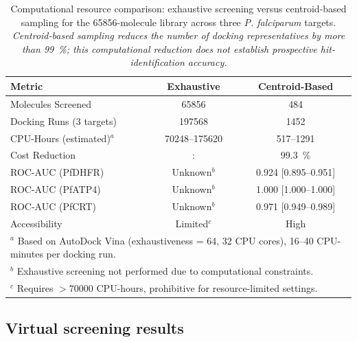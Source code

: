\documentclass[journal=jcisd8,manuscript=suppinfo]{achemso}
\begin{document}
\begin{table}[!htbp]
\centering
\caption{Computational resource comparison: exhaustive screening versus centroid-based sampling for the \num{65856}-molecule library across three \textit{P. falciparum} targets. \textit{Centroid-based sampling reduces the number of docking representatives by more than \qty{99}{\percent}; this computational reduction does not establish prospective hit-identification accuracy.}}
\label{tab:computational_comparison}
\small
\begin{tabular}{lcc}
\toprule
\textbf{Metric} & \textbf{Exhaustive} & \textbf{Centroid-Based} \\
\midrule
Molecules Screened & \num{65856} & \num{484} \\
Docking Runs (3 targets) & \num{197568} & \num{1452} \\
CPU-Hours (estimated)$^a$ & \numrange{70248}{175620} & \numrange{517}{1291} \\
Cost Reduction & : & \qty{99.3}{\percent} \\
\midrule
ROC-AUC (PfDHFR) & Unknown$^b$ & \num{0.924} [\numrange{0.895}{0.951}] \\
ROC-AUC (PfATP4) & Unknown$^b$ & \num{1.000} [\numrange{1.000}{1.000}] \\
ROC-AUC (PfCRT) & Unknown$^b$ & \num{0.971} [\numrange{0.949}{0.989}] \\
\midrule
Accessibility & Limited$^c$ & High \\
\bottomrule
\multicolumn{3}{p{14cm}}{
$^a$ Based on AutoDock Vina (exhaustiveness = \num{64}, \num{32} CPU cores), \numrange{16}{40} CPU-minutes per docking run.}\\
\multicolumn{3}{p{14cm}}{$^b$ Exhaustive screening not performed due to computational constraints.}\\
\multicolumn{3}{p{14cm}}{$^c$ Requires $>\num{70000}$ CPU-hours, prohibitive for resource-limited settings.
}
\end{tabular}
\end{table}

\subsection*{Virtual screening results}
\end{document}
